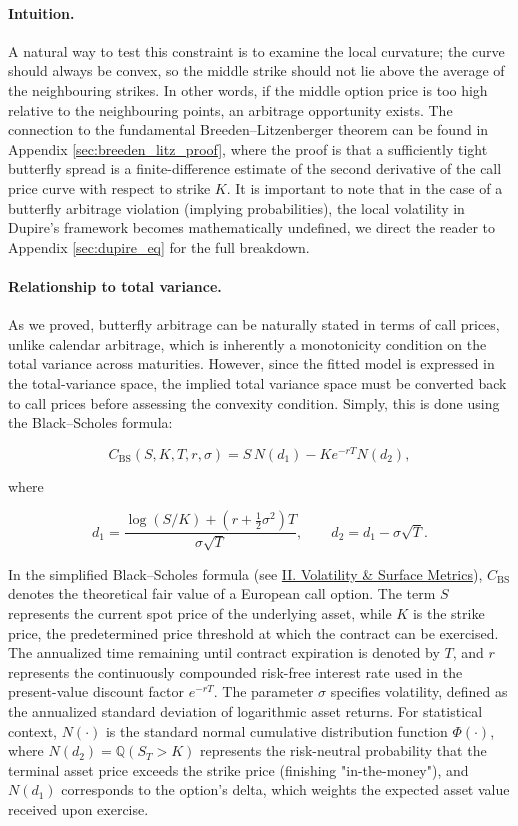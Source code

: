 \documentclass[12pt,oneside]{report}
\theoremstyle{definition}
\theoremstyle{remark}
\begin{document}
\paragraph{Intuition.}
A natural way to test this constraint is to examine the local curvature; the curve should always be convex, so the middle strike should not lie above the average of the neighbouring strikes. In other words, if the middle option price is too high relative to the neighbouring points, an arbitrage opportunity exists. The connection to the fundamental Breeden--Litzenberger theorem can be found in Appendix \ref{sec:breeden_litz_proof}, where the proof is that a sufficiently tight butterfly spread is a finite-difference estimate of the second derivative of the call price curve with respect to strike $K$. It is important to note that in the case of a butterfly arbitrage violation (implying probabilities), the local volatility in Dupire's framework becomes mathematically undefined, we direct the reader to Appendix \ref{sec:dupire_eq} for the full breakdown.

\paragraph{Relationship to total variance.}
As we proved, butterfly arbitrage can be naturally stated in terms of call prices, unlike calendar arbitrage, which is inherently a monotonicity condition on the total variance across maturities. However, since the fitted model is expressed in the total-variance space, the implied total variance space must be converted back to call prices before assessing the convexity condition. Simply, this is done using the Black--Scholes formula:

$$ C_{\mathrm{BS}}(S,K,T,r,\sigma) = S\,N(d_1) - K e^{-rT}N(d_2),$$

where

$$d_1 = \frac{\log(S/K) + (r + \tfrac12\sigma^2)T}{\sigma\sqrt{T}}, \qquad d_2 = d_1 - \sigma\sqrt{T}. $$

In the simplified Black–Scholes formula (see \hyperref[sec:glossary_volatility_surface_metrics]{II. Volatility \& Surface Metrics}), $C_{\mathrm{BS}}$ denotes the theoretical fair value of a European call option. The term $S$ represents the current spot price of the underlying asset, while $K$ is the strike price, the predetermined price threshold at which the contract can be exercised. The annualized time remaining until contract expiration is denoted by $T$, and $r$ represents the continuously compounded risk-free interest rate used in the present-value discount factor $e^{-rT}$. The parameter $\sigma$ specifies volatility, defined as the annualized standard deviation of logarithmic asset returns. For statistical context, $N(\cdot)$ is the standard normal cumulative distribution function $\Phi(\cdot)$, where $N(d_2) = \mathbb{Q}(S_T > K)$ represents the risk-neutral probability that the terminal asset price exceeds the strike price (finishing "in-the-money"), and $N(d_1)$ corresponds to the option's delta, which weights the expected asset value received upon exercise.
\end{document}
